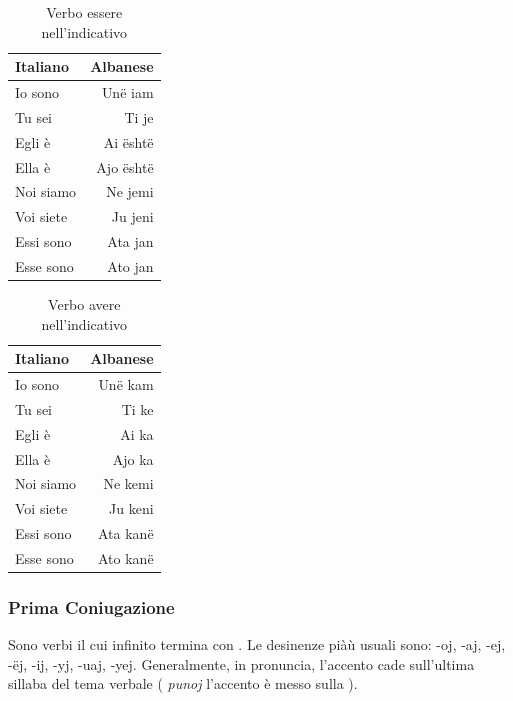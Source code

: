 \begin{table}[H]
    \centering
    \begin{tabular}{lr}
        \toprule
        Italiano    &   Albanese \\
        \midrule
        Io sono & Unë iam \\
        Tu sei & Ti je\\
        Egli è & Ai është\\
        Ella è & Ajo është\\
        Noi siamo & Ne jemi \\
        Voi siete & Ju jeni \\
        Essi sono & Ata jan \\
        Esse sono & Ato jan \\
        \bottomrule
    \end{tabular}
    \caption{Verbo essere nell'indicativo}
\end{table}

\begin{table}[H]
    \centering
    \begin{tabular}{lr}
        \toprule
        Italiano    &   Albanese \\
        \midrule
        Io sono & Unë kam \\
        Tu sei & Ti ke\\
        Egli è & Ai ka\\
        Ella è & Ajo ka\\
        Noi siamo & Ne kemi \\
        Voi siete & Ju keni \\
        Essi sono & Ata kanë \\
        Esse sono & Ato kanë \\
        \bottomrule
    \end{tabular}
    \caption{Verbo avere nell'indicativo}
\end{table}

\subsubsection{Prima Coniugazione}

Sono verbi il cui infinito termina con . Le desinenze piàù usuali sono: -oj, -aj, -ej, -ëj, -ij, -yj, -uaj, -yej. Generalmente, in pronuncia, l'accento cade sull'ultima sillaba del tema verbale (\eg{} \textit{punoj} l'accento è messo sulla )\cite{vocedellaquila:verbiprimogruppo, viola:verbiprimogruppo}.

